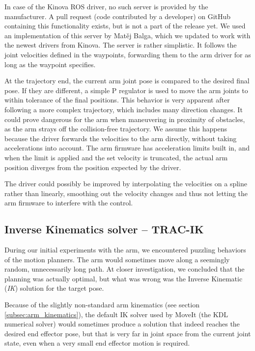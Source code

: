 \documentclass[buriama8_dp.tex]{subfiles}
\begin{document}
In case of the Kinova ROS driver, no such server is provided by the manufacturer. A pull request (code contributed by a developer) on GitHub containing this functionality exists, but is not a part of the release yet. We used an implementation of this server by Matěj Balga, which we updated to work with the newest drivers from Kinova. The server is rather simplistic. It follows the joint velocities defined in the waypoints, forwarding them to the arm driver for as long as the waypoint specifies.

At the trajectory end, the current arm joint pose is compared to the desired final pose. If they are different, a simple P regulator is used to move the arm joints to within tolerance of the final positions. This behavior is very apparent after following a more complex trajectory, which includes many direction changes. It could prove dangerous for the arm when maneuvering in proximity of obstacles, as the arm strays off the collision-free trajectory. We assume this happens because the driver forwards the velocities to the arm directly, without taking accelerations into account. The arm firmware has acceleration limits built in, and when the limit is applied and the set velocity is truncated, the actual arm position diverges from the position expected by the driver.

The driver could possibly be improved by interpolating the velocities on a spline rather than linearly, smoothing out the velocity changes and thus not letting the arm firmware to interfere with the control.

\subsection{Inverse Kinematics solver -- TRAC-IK}
\label{subsec:tracik}

During our initial experiments with the arm, we encountered puzzling behaviors of the motion planners. The arm would sometimes move along a seemingly random, unnecessarily long path. At closer investigation, we concluded that the planning was actually optimal, but what was wrong was the Inverse Kinematic (\emph{IK}) solution for the target pose.


Because of the slightly non-standard arm kinematics (see section \ref{subsec:arm_kinematics}), the default IK solver used by MoveIt (the KDL numerical solver) would sometimes produce a solution that indeed reaches the desired end effector pose, but that is very far in joint space from the current joint state, even when a very small end effector motion is required.
\end{document}

